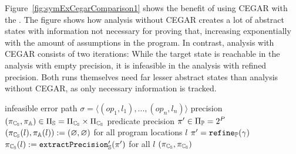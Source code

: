 Figure~\ref{fig:symExCegarComparison1} shows the benefit of using CEGAR with the \symbolicExecutionCPA.
The figure shows how analysis without CEGAR creates a lot of abstract states with information not necessary for proving that, increasing exponentially with the amount of assumptions in the program.
In contrast, analysis with CEGAR consists of two iterations: While the target state is reachable in the analysis with empty precision, it is infeasible in the analysis with refined precision.
Both runs themselves need far lesser abstract states than analysis without CEGAR, as only necessary information is tracked.

\begin{algorithm}[t]
\caption{$\refineSymbolicPred{\sigma}$}
\label{alg:refineSym2}
\begin{algorithmic}[1]
\Input infeasible error path $\sigma = \langle (op_1, l_1), ..., (op_n, l_n) \rangle$
\Output precision $(\pi_{\mathbb{C_{S}}}, \pi_{\mathbb{A}}) \in \Pi_{\mathbb{S}} = \Pi_{\mathbb{C_{S}}} \times \Pi_{\mathbb{C_{S}}}$
\Variables predicate precision $\pi' \in \Pi_{\mathbb{P}} = 2^P$
\State $(\pi_{\mathbb{C_{S}}}(l), \pi_{\mathbb{A}}(l)) := (\varnothing, \varnothing)$ for all program locations $l$
\State $\pi' = \texttt{refine}_{\mathbb{P}}(\gamma)$
\State $\pi_{\mathbb{C_{S}}}(l) := \texttt{extractPrecision}'_{\mathbb{S}}(\pi')$ for all $l$
\State %
\Return $(\pi_{\mathbb{C_{S}}}, \pi_{\mathbb{C_{S}}})$
\end{algorithmic}
\end{algorithm}


